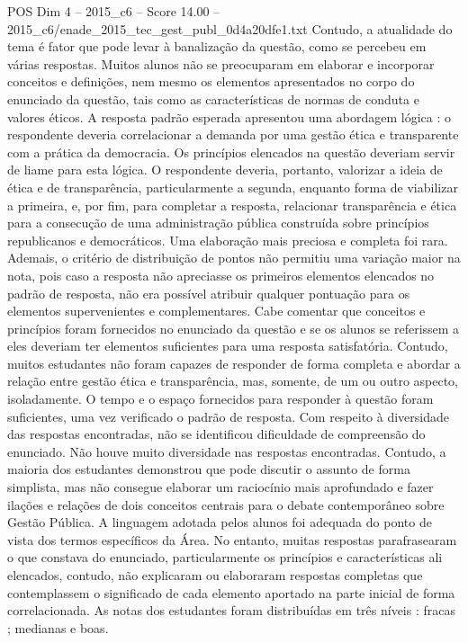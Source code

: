 \begin{textsample}{POS Dim 4 – 2015\_c6 – Score 14.00 – 2015\_c6/enade\_2015\_tec\_gest\_publ\_0d4a20dfe1.txt}
Contudo, a atualidade do tema é fator que pode levar à banalização da questão, como se percebeu em várias respostas.
Muitos alunos não se preocuparam em elaborar e incorporar conceitos e definições, nem mesmo os elementos apresentados no corpo do enunciado da questão, tais como as características de normas de conduta e valores éticos.
A resposta padrão esperada apresentou uma abordagem lógica : o respondente deveria correlacionar a demanda por uma gestão ética e transparente com a prática da democracia.
Os princípios elencados na questão deveriam servir de liame para esta lógica.
O respondente deveria, portanto, valorizar a ideia de ética e de transparência, particularmente a segunda, enquanto forma de viabilizar a primeira, e, por fim, para completar a resposta, relacionar transparência e ética para a consecução de uma administração pública construída sobre princípios republicanos e democráticos.
Uma elaboração mais preciosa e completa foi rara.
Ademais, o critério de distribuição de pontos não permitiu uma variação maior na nota, pois caso a resposta não apreciasse os primeiros elementos elencados no padrão de resposta, não era possível atribuir qualquer pontuação para os elementos supervenientes e complementares.
Cabe comentar que conceitos e princípios foram fornecidos no enunciado da questão e se os alunos se referissem a eles deveriam ter elementos suficientes para uma resposta satisfatória.
Contudo, muitos estudantes não foram capazes de responder de forma completa e abordar a relação entre gestão ética e transparência, mas, somente, de um ou outro aspecto, isoladamente.
O tempo e o espaço fornecidos para responder à questão foram suficientes, uma vez verificado o padrão de resposta.
Com respeito à diversidade das respostas encontradas, não se identificou dificuldade de compreensão do enunciado.
Não houve muito diversidade nas respostas encontradas.
Contudo, a maioria dos estudantes demonstrou que pode discutir o assunto de forma simplista, mas não consegue elaborar um raciocínio mais aprofundado e fazer ilações e relações de dois conceitos centrais para o debate contemporâneo sobre Gestão Pública.
A linguagem adotada pelos alunos foi adequada do ponto de vista dos termos específicos da Área.
No entanto, muitas respostas parafrasearam o que constava do enunciado, particularmente os princípios e características ali elencados, contudo, não explicaram ou elaboraram respostas completas que contemplassem o significado de cada elemento aportado na parte inicial de forma correlacionada.
As notas dos estudantes foram distribuídas em três níveis : fracas ; medianas e boas.

\end{textsample}
